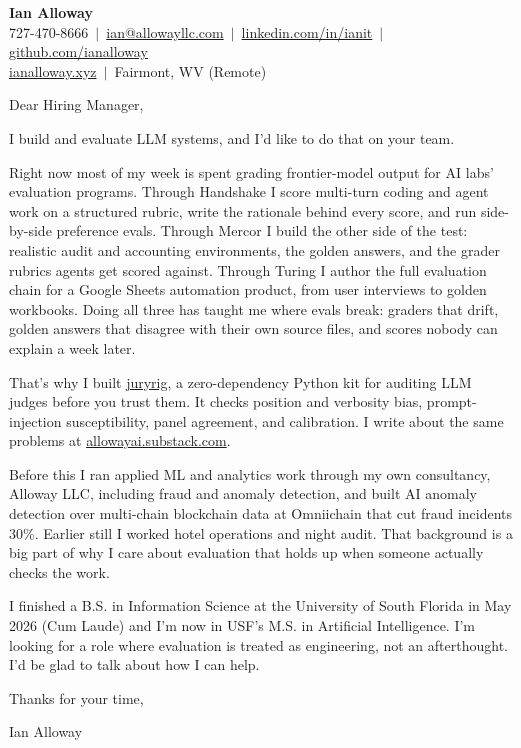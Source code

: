 \documentclass[11pt,letterpaper]{article}
\begin{document}
{\Large\bfseries Ian Alloway} \\[2pt]
727-470-8666 \,$\vert$\, \href{mailto:ian@allowayllc.com}{ian@allowayllc.com} \,$\vert$\, \href{https://linkedin.com/in/ianit}{linkedin.com/in/ianit} \,$\vert$\, \href{https://github.com/ianalloway}{github.com/ianalloway} \\
\href{https://ianalloway.xyz}{ianalloway.xyz} \,$\vert$\, Fairmont, WV (Remote)

\vspace{6pt}

Dear Hiring Manager,

I build and evaluate LLM systems, and I'd like to do that on your team.

Right now most of my week is spent grading frontier-model output for AI labs' evaluation programs. Through Handshake I score multi-turn coding and agent work on a structured rubric, write the rationale behind every score, and run side-by-side preference evals. Through Mercor I build the other side of the test: realistic audit and accounting environments, the golden answers, and the grader rubrics agents get scored against. Through Turing I author the full evaluation chain for a Google Sheets automation product, from user interviews to golden workbooks. Doing all three has taught me where evals break: graders that drift, golden answers that disagree with their own source files, and scores nobody can explain a week later.

That's why I built \href{https://github.com/ianalloway/juryrig}{juryrig}, a zero-dependency Python kit for auditing LLM judges before you trust them. It checks position and verbosity bias, prompt-injection susceptibility, panel agreement, and calibration. I write about the same problems at \href{https://allowayai.substack.com}{allowayai.substack.com}.

Before this I ran applied ML and analytics work through my own consultancy, Alloway LLC, including fraud and anomaly detection, and built AI anomaly detection over multi-chain blockchain data at Omniichain that cut fraud incidents 30\%. Earlier still I worked hotel operations and night audit. That background is a big part of why I care about evaluation that holds up when someone actually checks the work.

I finished a B.S. in Information Science at the University of South Florida in May 2026 (Cum Laude) and I'm now in USF's M.S. in Artificial Intelligence. I'm looking for a role where evaluation is treated as engineering, not an afterthought. I'd be glad to talk about how I can help.

Thanks for your time,

Ian Alloway
\end{document}
